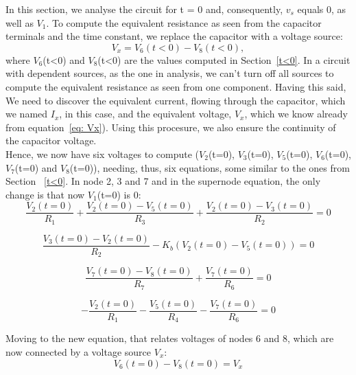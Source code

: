 \noindent In this section, we analyse the circuit for t = 0 and, consequently, $v_s$ equals 0, as well as $V_1$. 
To compute the equivalent resistance as seen from the capacitor terminals and the time constant, we replace the capacitor with a voltage source:
\begin{equation}
V_x = V_6(t<0) - V_8(t<0),
  \label{eq: Vx}
\end{equation}
where $V_6$(t<0) and $V_8$(t<0) are the values computed in Section~\ref{t<0}. 
\noindent In a circuit with dependent sources, as the one in analysis, we can't turn off all sources to compute the equivalent resistance as seen from one component.
Having this said, We need to discover the equivalent current, flowing through the capacitor, which we named $I_x$, 
in this case, and the equivalent voltage, $V_x$, which we know already from equation~\ref{eq: Vx}).
Using this procesure, we also ensure the continuity of the capacitor voltage. \\
\noindent Hence, we now have six voltages to compute ($V_2$(t=0), $V_3$(t=0), $V_5$(t=0), $V_6$(t=0), $V_7$(t=0) and $V_8$(t=0)), needing, thus, six equations, 
some similar to the ones from Section ~\ref{t<0}.
In node 2, 3 and 7 and in the supernode equation, the only change is that now $V_1$(t=0) is 0:
\begin{equation}
\frac{V_2(t=0)}{R_1} + \frac{V_2(t=0) - V_5(t=0)}{R_3} + \frac{V_2(t=0) - V_3(t=0)}{R_2} = 0
  \label{eq:2kvl_node2}
\end{equation}

\begin{equation}
\frac{V_3(t=0) - V_2(t=0)}{R_2} - K_b(V_2(t=0) - V_5(t=0)) = 0
  \label{eq:2kvl_node3}
\end{equation}

\begin{equation}
\frac{V_7(t=0) - V_8(t=0)}{R_7} + \frac{V_7(t=0)}{R_6} = 0
  \label{eq:3kvl_node7}
\end{equation}

\begin{equation}
-\frac{V_2(t=0)}{R_1} - \frac{V_5(t=0)}{R_4} - \frac{V_7(t=0)}{R_6} = 0
  \label{eq:supernode2}
\end{equation}

\noindent Moving to the new equation, that relates voltages of nodes 6 and 8, which are now connected by a voltage source $V_x$:
\begin{equation}
V_6(t=0) - V_8(t=0) = V_x
  \label{eq:V68}
\end{equation}

